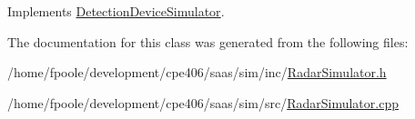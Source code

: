 Implements \hyperlink{class_detection_device_simulator_ae9e5d29238a9bcc104b4004b52ddffd9}{Detection\+Device\+Simulator}.



The documentation for this class was generated from the following files\+:\begin{DoxyCompactItemize}
\item 
/home/fpoole/development/cpe406/saas/sim/inc/\hyperlink{_radar_simulator_8h}{Radar\+Simulator.\+h}\item 
/home/fpoole/development/cpe406/saas/sim/src/\hyperlink{_radar_simulator_8cpp}{Radar\+Simulator.\+cpp}\end{DoxyCompactItemize}
